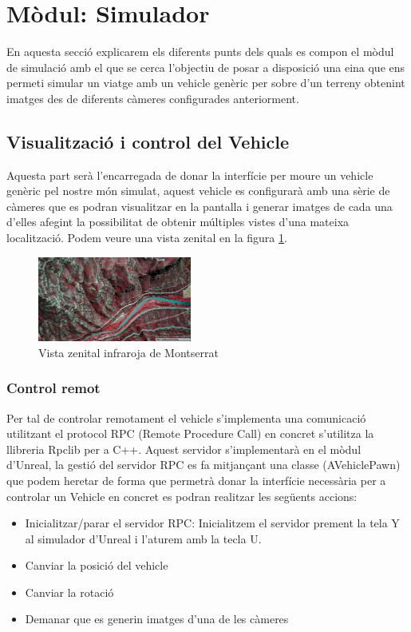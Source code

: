 \documentclass[10pt,a4paper,twocolumn,twoside]{article}
\begin{document}
\section{Mòdul: Simulador}

En aquesta secció explicarem els diferents punts dels quals es compon el mòdul de simulació amb el que se cerca l'objectiu de posar a disposició una eina que ens permeti simular un viatge amb un vehicle genèric per sobre d'un terreny obtenint imatges des de diferents càmeres configurades anteriorment.

\subsection{Visualització i control del Vehicle}
Aquesta part serà l'encarregada de donar la interfície per moure un vehicle genèric pel nostre món simulat, aquest vehicle es configurarà amb una sèrie de càmeres que es podran visualitzar en la pantalla i generar imatges de cada una d'elles afegint la possibilitat de obtenir múltiples vistes d'una mateixa localització. Podem veure una vista zenital en la figura \ref{fig-montserratir}.

\begin{figure}[!h]
\centering
  	\includegraphics[width=0.45\textwidth]{cenitalviewir}
	\caption{Vista zenital infraroja de Montserrat}
	\label{fig-montserratir}
\end{figure}

\subsubsection{Control remot}
Per tal de controlar remotament el vehicle s'implementa una comunicació utilitzant el protocol RPC (Remote Procedure Call) en concret s'utilitza la llibreria Rpclib\cite{rpclib} per a C++. Aquest servidor s'implementarà en el mòdul d'Unreal, la gestió del servidor RPC es fa mitjançant una classe (AVehiclePawn) que podem heretar de forma que permetrà donar la interfície necessària per a controlar un Vehicle en concret es podran realitzar les següents accions:

\begin{itemize}
\item Inicialitzar/parar el servidor RPC: Inicialitzem el servidor prement la tela Y al simulador d'Unreal i l'aturem amb la tecla U.
\item Canviar la posició del vehicle
\item Canviar la rotació
\item Demanar que es generin imatges d'una de les càmeres
\end{itemize}
\end{document}
